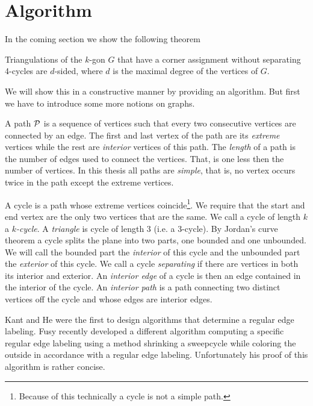 
\section{Algorithm}
\label{s:algo}

In the coming section we show the following theorem

\begin{thrm}
  \label{th:dsided}
  Triangulations of the $k$-gon $G$ that have a corner assignment without separating 4-cycles are $d$-sided, where $d$ is the maximal degree of the vertices of $G$.
\end{thrm}

We will show this in a constructive manner by providing an algorithm. But first we have to introduce some more notions on graphs.

  A path $\P$ is a sequence of vertices such that every two consecutive vertices are connected by an edge. The first and last vertex of the path are its \emph{extreme} vertices while the rest are \emph{interior} vertices of this path. The \emph{length} of a path is the number of edges used to connect the vertices. That, is one less then the number of vertices. In this thesis all paths are \emph{simple}, that is, no vertex occurs twice in the path except the extreme vertices.

  A cycle is a path whose extreme vertices coincide\footnote{Because of this technically a cycle is not a simple path.}. We require that the start and end vertex are the only two vertices that are the same. We call a cycle of length $k$  a \emph{$k$-cycle}. A \emph{triangle} is cycle of length $3$ (i.e. a $3$-cycle). By Jordan's curve theorem a cycle splits the plane into two parts, one bounded and one unbounded. We will call the bounded part the \emph{interior} of this cycle and the unbounded part the \emph{exterior} of this cycle.
  We call a cycle \emph{separating} if there are vertices in both its interior and exterior.
  An \emph{interior edge} of a cycle is then an edge contained in the interior of the cycle.
  An \emph{interior path} is a path connecting two distinct vertices off the cycle and whose edges are interior edges.


  Kant and He \cite{Kant1997} were the first to design algorithms that determine a regular edge labeling. Fusy \cite{Fusy2006} recently developed a different algorithm computing a specific regular edge labeling using a method shrinking a sweepcycle while coloring the outside in accordance with a regular edge labeling. Unfortunately his proof of this algorithm is rather concise.

